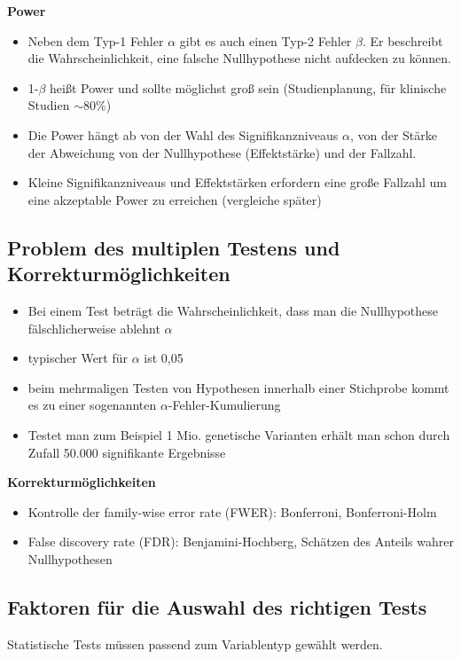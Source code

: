 \textbf{Power}
\begin{itemize}
	\item Neben dem Typ-1 Fehler $\alpha$ gibt es auch einen Typ-2 Fehler $\beta$. Er beschreibt die Wahrscheinlichkeit, eine falsche Nullhypothese nicht aufdecken zu können.
	\item 1-$\beta$ heißt Power und sollte möglichst groß sein (Studienplanung, für klinische Studien $\sim$80\%)
	\item Die Power hängt ab von der Wahl des Signifikanzniveaus $\alpha$, von der Stärke der Abweichung von der Nullhypothese (Effektstärke) und der Fallzahl.
	\item Kleine Signifikanzniveaus und Effektstärken erfordern eine große Fallzahl um eine akzeptable Power zu erreichen (vergleiche später)
\end{itemize}

\subsection{Problem des multiplen Testens und Korrekturmöglichkeiten}
\begin{itemize}
	\item Bei einem Test beträgt die Wahrscheinlichkeit, dass man die Nullhypothese fälschlicherweise ablehnt $\alpha$
	\item typischer Wert für $\alpha$ ist 0,05
	\item beim mehrmaligen Testen von Hypothesen innerhalb einer Stichprobe kommt es zu einer sogenannten $\alpha$-Fehler-Kumulierung
	\item Testet man zum Beispiel 1 Mio. genetische Varianten erhält man schon durch Zufall 50.000 signifikante Ergebnisse
\end{itemize}

\textbf{Korrekturmöglichkeiten}
\begin{itemize}
	\item Kontrolle der family-wise error rate (FWER): Bonferroni, Bonferroni-Holm
	\item False discovery rate (FDR): Benjamini-Hochberg, Schätzen des Anteils wahrer Nullhypothesen
\end{itemize}

\subsection{Faktoren für die Auswahl des richtigen Tests}
Statistische Tests müssen passend zum Variablentyp gewählt werden.

